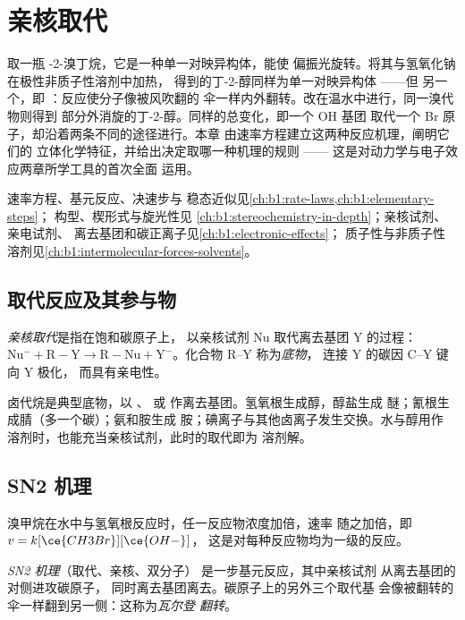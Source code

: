 \chapter{亲核取代}\label{ch:b1:nucleophilic-substitution}

取一瓶 -2-溴丁烷，它是一种单一对映异构体，能使
偏振光旋转。将其与氢氧化钠在极性非质子性溶剂中加热，
得到的丁-2-醇同样为单一对映异构体 ——但
另一个，即 ：反应使分子像被风吹翻的
伞一样内外翻转。改在温水中进行，同一溴代物则得到
部分外消旋的丁-2-醇。同样的总变化，即一个 OH 基团
取代一个 Br 原子，却沿着两条不同的途径进行。本章
由速率方程建立这两种反应机理，阐明它们的
立体化学特征，并给出决定取哪一种机理的规则 ——
这是对动力学与电子效应两章所学工具的首次全面
运用。

\begin{recall}
速率方程、基元反应、决速步与
稳态近似见\cref{ch:b1:rate-laws,ch:b1:elementary-steps}；
构型、楔形式与旋光性见
\cref{ch:b1:stereochemistry-in-depth}；亲核试剂、亲电试剂、
离去基团和碳正离子见\cref{ch:b1:electronic-effects}；
质子性与非质子性溶剂见\cref{ch:b1:intermolecular-forces-solvents}。
\end{recall}

\section{取代反应及其参与物}

\begin{definition}[亲核取代，底物]\label{def:b1:nucleophilic-substitution:substitution}
\emph{亲核取代}是指在饱和碳原子上，
以亲核试剂 Nu 取代离去基团 Y 的过程：
$\mathrm{Nu^-} + \mathrm{R{-}Y} \to \mathrm{R{-}Nu} +
\mathrm{Y^-}$。化合物 R--Y 称为\emph{底物}，
连接 Y 的碳因 C--Y 键向 Y 极化，
而具有亲电性。
\end{definition}

卤代烷是典型底物，以 、 或
 作离去基团。氢氧根生成醇，醇盐生成
醚；氰根生成腈（多一个碳）；氨和胺生成
胺；碘离子与其他卤离子发生交换。水与醇用作
溶剂时，也能充当亲核试剂，此时的取代即为
溶剂解。

\section{SN2 机理}

溴甲烷在水中与氢氧根反应时，任一反应物浓度加倍，速率
随之加倍，即 $v = k[\ce{CH3Br}][\ce{OH-}]$，
这是对每种反应物均为一级的反应。

\begin{definition}[SN2 机理，瓦尔登翻转]\label{def:b1:nucleophilic-substitution:sn2}
\emph{SN2 机理}（取代、亲核、双分子）
是一步基元反应，其中亲核试剂
从离去基团的对侧进攻碳原子，
同时离去基团离去。碳原子上的另外三个取代基
会像被翻转的伞一样翻到另一侧：这称为\emph{瓦尔登
翻转}。
\end{definition}

